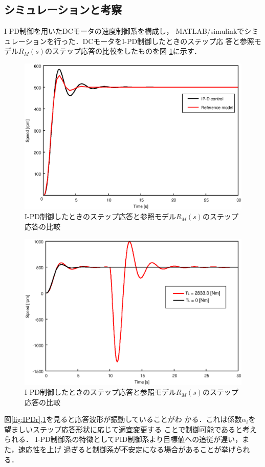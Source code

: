\documentclass[a4paper,12pt]{jarticle}
\begin{document}
\subsection{シミュレーションと考察}
I-PD制御を用いたDCモータの速度制御系を構成し，
MATLAB/simulinkでシミュレーションを行った．DCモータをI-PD制御したときのステップ応
答と参照モデル$R_M(s)$のステップ応答の比較をしたものを図
\ref{fig:IPD_com}に示す．
%
\begin{figure}[tbp]
 \begin{center}
  \includegraphics[width = 150mm]{fig/IPD_com.eps}
 \end{center}
 \caption{I-PD制御したときのステップ応答と参照モデル$R_M(s)$のステップ応答の比較}
 \label{fig:IPD_com}
\end{figure}
%
%
\begin{figure}[tbp]
 \begin{center}
  \includegraphics[width = 150mm]{fig/IPD_TL.eps}
 \end{center}
 \caption{I-PD制御したときのステップ応答と参照モデル$R_M(s)$のステップ応答の比較}
 \label{fig:IPD_TL}
\end{figure}
%
図\ref{fig:IPDr},\ref{fig:IPD_com}を見ると応答波形が振動していることがわ
かる．これは係数$\alpha_i$を望ましいステップ応答形状に応じて適宜変更する
ことで制御可能であると考えられる．
%
I-PD制御系の特徴としてPID制御系より目標値への追従が遅い，また，速応性を上げ
過ぎると制御系が不安定になる場合があることが挙げられる．
\end{document}
